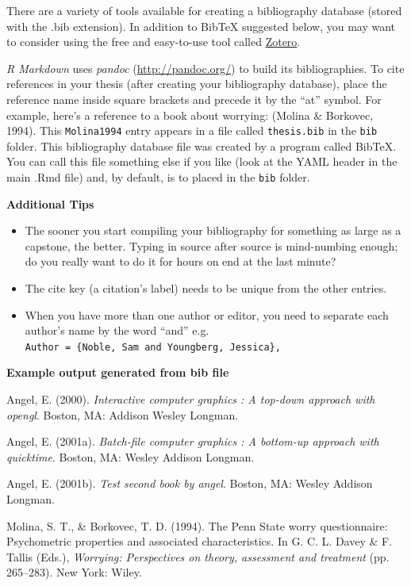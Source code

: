 \documentclass[12pt,oneside]{chicagocapstone}
\providecommand{\tightlist}{%
  \setlength{\itemsep}{0pt}\setlength{\parskip}{0pt}}
\begin{document}
There are a variety of tools available for creating a bibliography database (stored with the .bib extension). In addition to BibTeX suggested below, you may want to consider using the free and easy-to-use tool called \href{https://www.zotero.org/}{Zotero}.

\emph{R Markdown} uses \emph{pandoc} (\url{http://pandoc.org/}) to build its bibliographies. To cite references in your thesis (after creating your bibliography database), place the reference name inside square brackets and precede it by the ``at'' symbol. For example, here's a reference to a book about worrying: (Molina \& Borkovec, 1994). This \texttt{Molina1994} entry appears in a file called \texttt{thesis.bib} in the \texttt{bib} folder. This bibliography database file was created by a program called BibTeX. You can call this file something else if you like (look at the YAML header in the main .Rmd file) and, by default, is to placed in the \texttt{bib} folder.

\textbf{Additional Tips}
\begin{itemize}
\tightlist
\item
  The sooner you start compiling your bibliography for something as large as a capstone, the better. Typing in source after source is mind-numbing enough; do you really want to do it for hours on end at the last minute?
\item
  The cite key (a citation's label) needs to be unique from the other entries.
\item
  When you have more than one author or editor, you need to separate each author's name by the word ``and'' e.g. \texttt{Author\ =\ \{Noble,\ Sam\ and\ Youngberg,\ Jessica\},}
\end{itemize}
\textbf{Example output generated from bib file}

\hypertarget{refs}{}
\leavevmode\hypertarget{ref-angel2000}{}%
Angel, E. (2000). \emph{Interactive computer graphics : A top-down approach with opengl}. Boston, MA: Addison Wesley Longman.

\leavevmode\hypertarget{ref-angel2001}{}%
Angel, E. (2001a). \emph{Batch-file computer graphics : A bottom-up approach with quicktime}. Boston, MA: Wesley Addison Longman.

\leavevmode\hypertarget{ref-angel2002a}{}%
Angel, E. (2001b). \emph{Test second book by angel}. Boston, MA: Wesley Addison Longman.

\leavevmode\hypertarget{ref-Molina1994}{}%
Molina, S. T., \& Borkovec, T. D. (1994). The Penn State worry questionnaire: Psychometric properties and associated characteristics. In G. C. L. Davey \& F. Tallis (Eds.), \emph{Worrying: Perspectives on theory, assessment and treatment} (pp. 265--283). New York: Wiley.


\end{document}
